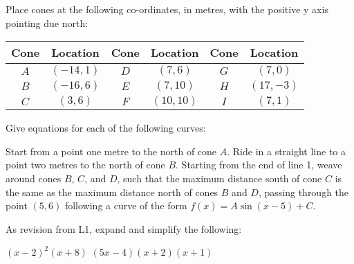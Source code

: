 Place cones at the following co-ordinates, in metres, with the positive y axis pointing due north:

\begin{center}
  \begin{tabular}{|c|c||c|c||c|c|}\hline
    \textbf{Cone} & \textbf{Location} & \textbf{Cone} & \textbf{Location} & \textbf{Cone} & \textbf{Location}\\\hline
    $ A $ & $ (-14,1) $ & $ D $ & $ (7,6) $ & $ G $ & $ (7,0) $\\\hline
    $ B $ & $ (-16,6) $ & $ E $ & $ (7,10) $ & $ H $ & $ (17,-3) $\\\hline
    $ C $ & $ (3,6) $ & $ F $ & $ (10,10) $ & $ I $ & $ (7,1) $ \\\hline
  \end{tabular}
\end{center}

Give equations for each of the following curves:
\begin{questions}
  \question Start from a point one metre to the north of cone $A$. Ride in a straight line to a point two metres to the north of cone $B$.
  \question Starting from the end of line 1, weave around cones $B$, $C$, and $D$, such that the maximum distance south of cone $C$ is the
            same as the maximum distance north of cones $B$ and $D$, passing through the point $(5,6)$ following a curve of the form $f(x) = A\sin(x - 5) + C $.
\end{questions}

As revision from L1, expand and simplify the following:
\begin{questions}
  \question $ (x - 2)^2(x + 8) $
  \question $ (5x - 4)(x + 2)(x + 1) $
\end{questions}



